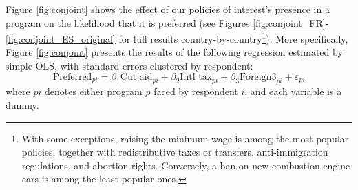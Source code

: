 \documentclass[12pt,english]{article}
\begin{document}
\begin{bibunit}
Figure \ref{fig:conjoint} shows the effect of our policies of interest's presence in a program on the likelihood that it is preferred (see Figures \ref{fig:conjoint_FR}-\ref{fig:conjoint_ES_original} for full results country-by-country\footnote{With some exceptions, raising the minimum wage is among the most popular policies, together with redistributive taxes or transfers, anti-immigration regulations, and abortion rights. %
Conversely, a ban on new combustion-engine cars is among the least popular ones.}). 
More specifically, Figure \ref{fig:conjoint} presents the results %
of the following regression estimated by simple OLS, with standard errors clustered by respondent: 
$$\text{Preferred}_{pi} = \beta_1 \text{Cut\_aid}_{pi} + \beta_2 \text{Intl\_tax}_{pi} + \beta_3 \text{Foreign3}_{pi} + \varepsilon_{pi}$$
where $pi$ denotes either program $p$ faced by respondent $i$, and each variable is a dummy. 


\end{bibunit}
\end{document}
